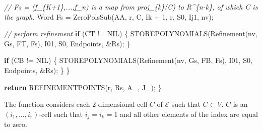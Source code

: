 \documentclass[
]{book}
\newenvironment{Shaded}{\begin{snugshade}}{\end{snugshade}}
\newcommand{\CommentTok}[1]{\textcolor[rgb]{0.56,0.35,0.01}{\textit{#1}}}
\newcommand{\ControlFlowTok}[1]{\textcolor[rgb]{0.13,0.29,0.53}{\textbf{#1}}}
\newcommand{\DecValTok}[1]{\textcolor[rgb]{0.00,0.00,0.81}{#1}}
\newcommand{\NormalTok}[1]{#1}
\theoremstyle{definition}
\theoremstyle{definition}
\theoremstyle{definition}
\theoremstyle{definition}
\theoremstyle{remark}
\begin{document}
\begin{Shaded}
\begin{Highlighting}[numbers=left,,]
        \CommentTok{// Fs = (f\_\{K+1\},...,f\_n) is a map from proj\_\{k\}(C) to R\^{}\{n{-}k\}, of which C is the graph.}
\NormalTok{        Word Fs = ZeroPolsSub(AA, r, C, Ik + }\DecValTok{1}\NormalTok{, r, S0, Ij1, nv);}

        \CommentTok{// perform refinement}
        \ControlFlowTok{if}\NormalTok{ (CT != NIL) \{}
\NormalTok{            STOREPOLYNOMIALS(Refinement(nv, Gs, FT, Fs), I01, S0, Endpoints, \&Rs);}
\NormalTok{        \}}

        \ControlFlowTok{if}\NormalTok{ (CB != NIL) \{}
\NormalTok{            STOREPOLYNOMIALS(Refinement(nv, Gs, FB, Fs), I01, S0, Endpoints, \&Rs);}
\NormalTok{        \}}
\NormalTok{    \}}

    \ControlFlowTok{return}\NormalTok{ REFINEMENTPOINTS(r, Rs, A\_, J\_);}
\NormalTok{\}}
\end{Highlighting}
\end{Shaded}

The function considers each \(2\)-dimensional cell \(C\) of \(\mathcal{E}\) such that \(C\subset V\). \(C\) is an \((i_1,\ldots,i_r)\)-cell such that \(i_j = i_k = 1\) and all other elements of the index are equal to zero.
\end{document}
